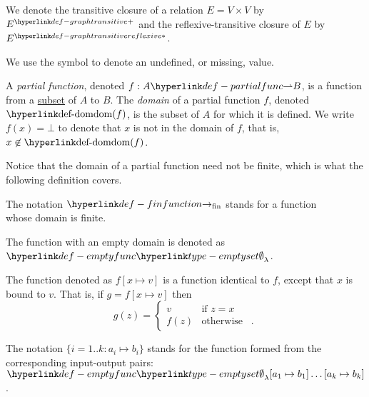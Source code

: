 \hypertarget{def-graphtransitive}{}
\hypertarget{def-graphtransitivereflexive}{}
\begin{definition}
We denote the transitive closure of a relation $E = V \times V$ by $\graphtransitive{E}$
and the reflexive-transitive closure of $E$ by $\graphtransitivereflexive{E}$.
\end{definition}

\begin{definition}
We use the symbol  to denote an undefined, or missing, value.
\end{definition}

\hypertarget{def-partialfunc}{}
\hypertarget{def-dom}{}
\begin{definition}
  A \emph{partial function}, denoted $f : A \partialto B$, is a function from a \underline{subset} of $A$ to $B$.
  The \emph{domain} of a partial function $f$, denoted $\dom(f)$, is the subset of $A$ for which it is defined.
  We write $f(x) = \bot$ to denote that $x$ is not in the domain of $f$, that is, $x \not\in \dom(f)$.
\end{definition}

Notice that the domain of a partial function need not be finite, which is what the following definition covers.

\hypertarget{def-finfunction}{}
\begin{definition}
The notation $\rightarrowfin$ stands for a function \\ whose domain is finite.
\end{definition}

\hypertarget{def-emptyfunc}{}
\begin{definition}
The function with an empty domain is denoted as $\emptyfunc$.
\end{definition}

\begin{definition}
  The function denoted as $f[x \mapsto v]$ is a function identical to $f$, except that $x$ is bound
  to $v$. That is, if  $g = f[x \mapsto v]$ then
  \[
    g(z) =
  \begin{cases}
    v     & \text{if } z = x\\
    f(z)  & \text{otherwise } \enspace.
  \end{cases}
  \]

  The notation $\{i=1..k: a_i\mapsto b_i\}$ stands for the function formed from the corresponding input-output pairs:
  $\emptyfunc[a_1\mapsto b_1]\ldots[a_k\mapsto b_k]$.
\end{definition}

